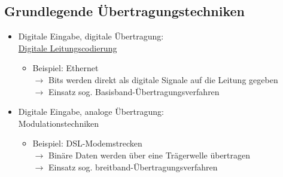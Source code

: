 \documentclass{scrreprt}
\begin{document}
\subsection*{Grundlegende Übertragungstechniken}
\begin{itemize}
	\item Digitale Eingabe, digitale Übertragung: \\\hyperref[sec:Leitungscodierung]{Digitale Leitungscodierung}
	      \begin{itemize}
		      \item Beispiel: Ethernet
		            \\$\rightarrow$ Bits werden direkt als digitale Signale auf die Leitung gegeben
			            \\$\rightarrow$ Einsatz sog. Basisband-Übertragungsverfahren
	      \end{itemize}
	\item Digitale Eingabe, analoge Übertragung: \\Modulationstechniken
	      \begin{itemize}
		      \item Beispiel: DSL-Modemstrecken
		            \\$\rightarrow$ Binäre Daten werden über eine Trägerwelle übertragen
			            \\$\rightarrow$ Einsatz sog. breitband-Übertragungsverfahren
	      \end{itemize}
\end{itemize}
\end{document}
